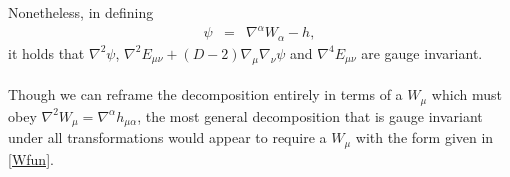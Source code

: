 \documentclass[10pt,letterpaper]{article}
\begin{document}
\\ \\
Nonetheless, in defining 
\begin{eqnarray}
\psi &=& \nabla^\alpha W_\alpha - h,
\end{eqnarray}
it holds that $\nabla^2 \psi$, $\nabla^2 E_{\mu\nu} + (D-2)\nabla_\mu \nabla_\nu \psi$ and $\nabla^4 E_{\mu\nu}$ are gauge invariant. 
\\ \\
Though we can reframe the decomposition entirely in terms of a $W_\mu$ which must obey $\nabla^2 W_\mu = \nabla^\alpha h_{\mu\alpha}$, the most general decomposition that is gauge invariant under all transformations would appear to require a $W_\mu$ with the form given in \eqref{Wfun}. 
\end{document}
